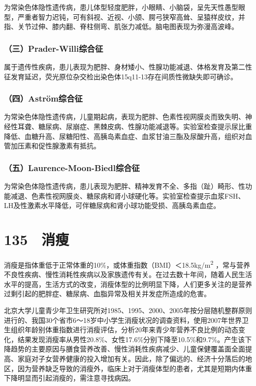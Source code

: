 为常染色体隐性遗传病，患儿体型轻度肥胖，小眼睛、小脑袋，呈先天性愚型眼型，严重者智力迟钝，可有斜视、近视、小颌、腭弓狭窄高耸、呈猿样皮纹，并指、关节过伸、膝内翻、脊柱侧弯、肌张力减低。脑电图表现为弥漫高波峰。

\subsubsection{（三）Prader-Willi综合征}

属于遗传性疾病，患儿表现为肥胖、身材矮小、性腺功能减退、体格发育及第二性征发育延迟，荧光原位杂交检出染色体15q11-13存在间质性微缺失即可确诊。

\subsubsection{（四）Aström综合征}

为常染色体隐性遗传病，儿童期起病，表现为肥胖、色素性视网膜炎而致失明、神经性耳聋、糖尿病、尿崩症、黑棘皮病、性腺功能减退等。实验室检查提示尿比重降低、血糖升高、尿糖阳性、高胰岛素血症、血浆甘油三酯及尿酸升高，组织对血管加压素和促性腺激素有抵抗。

\subsubsection{（五）Laurence-Moon-Biedl综合征}

为常染色体隐性遗传病，患儿表现为肥胖、精神发育不全、多指（趾）畸形、性功能减退、色素性视网膜炎、糖尿病和肾小球硬化等。实验室检查提示血浆FSH、LH及性激素水平降低，可伴糖尿病和肾小球功能受损、高胰岛素血症。

\protect\hypertarget{text00315.html}{}{}

\section{135　消瘦}

消瘦是指体重低于正常体重的10\%，或体重指数（BMI）＜18.5kg/m\textsuperscript{2}
，常与营养不良性疾病、慢性消耗性疾病以及家族遗传有关。在过去数十年间，随着人民生活水平的提高，生活方式的改变，消瘦体型的比例明显下降，人们更多关注的是营养过剩引起的肥胖症、糖尿病、血脂异常及相关并发症所造成的危害。

北京大学儿童青少年卫生研究所对1985、1995、2000、2005年按分层随机整群原则进行的、我国30个省市6～18岁中小学生消瘦状况的调查资料，使用2007年世界卫生组织年龄别体重指数进行消瘦评估，分析20年来青少年营养不良比例的动态变化，结果发现消瘦率从男性20.8\%、女性17.6\%分别下降至10.5\%和9.7\%。产生该下降趋势的主要原因与膳食营养改善、慢性消耗性疾病减少、儿童保健覆盖面全面提高、家庭对子女营养健康的投入增加有关。因此，除了偏远的、经济十分落后的地区，因为营养缺乏导致的消瘦外，临床上对于消瘦体型的患者，尤其是短期内体重下降明显而引起消瘦的，需注意寻找病因。

